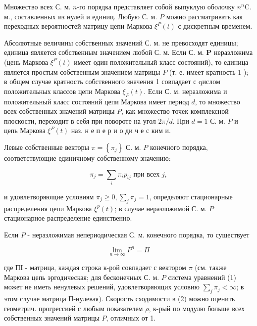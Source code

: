 \documentclass[10pt]{article}
\begin{document}
Множество всех С. м. $n$-го порядка представляет собой выпуклую оболочку $n^{n} \mathrm{C}$. м., составленных из нулей и единиц. Любую С. м. $P$ можно рассматривать как переходных вероятностей матрицу цепи Маркова $\xi^{P}(t)$ с дискретным временем.



Абсолютные величины собственных значений С. м. не превосходят единицы; единица является собственным значением любой С. м. Если С. м. $\boldsymbol{P}$ неразложима (цень Маркова $\xi^{P}(t)$ имеет один положительный класс состояний), то единица является простым собственным значением матрицы $P$ (т. е. имеет кратность 1 ); в общем случае кратность собственного значения 1 совпадает с qислом положительных классов цепи Маркова $\xi_{P}(t)$. Если С. м. неразложима и положительный класс состояний цепи Маркова имеет период $d$, то множество всех собственных значений матрицы $P$, как множество точек комплексной плоскости, переходит в себя при повороте на угол $2 \pi / d$. При $d=1$ С. м. $P$ и цепь Маркова $\xi^{P}(t)$ наз. н е п е р и о ди ч е с ким и.



Левые собственные векторы $\pi=\left\{\pi_{j}\right\}$ С. м. $P$ конечного порядка, соответствующие единичному собственному значению:



\[

\pi_{j}=\sum_{i} \pi_{i} p_{i j} \text { при всех } j,

\]



и удовлетворяющие условиям $\pi_{j} \geqslant 0, \sum_{j} \pi_{j}=1$, определяют стационарные распределения цепи Маркова $\xi^{p}(t)$; в случае неразложимой С. м. $P$ стационарное распределение единственно.



Если $P$ - неразложимая непериодическая С. м. конечного порядка, то существует



\[

\lim _{n \rightarrow \infty} P^{n}=\Pi

\]



где ПI - матрица, каждая строка к-рой совпадает с вектором $\pi$ (см. также Маркова цепь эргодическая; для бесконечных С. м. $P$ система уравнений (1) может не иметь ненулевых решений, удовлетворяющих условию $\sum_{j} \pi_{j}<\infty$; в этом случае матрица П-нулевая). Скорость сходимости в (2) можно оценить геометрич. прогрессией с любым показателем $\rho$, к-рый по модулю больше всех собственных значений матрицы $P$, отличных от 1.
\end{document}
